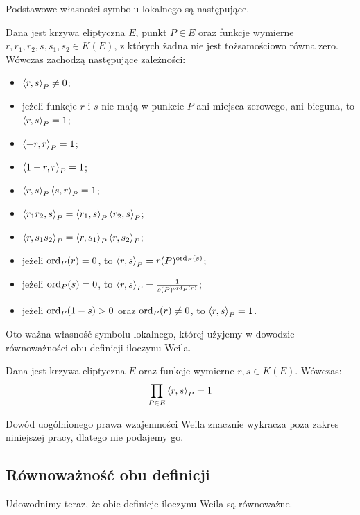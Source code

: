 Podstawowe własności symbolu lokalnego są następujące.

\begin{theorem}
Dana jest krzywa eliptyczna $E$, punkt $P \in E$
oraz funkcje wymierne $r, r_1, r_2, s, s_1, s_2 \in K(E)$,
z których żadna nie jest tożsamościowo równa zero.
Wówczas zachodzą następujące zależności:
\begin{itemize}
\item
$\left\langle r , s \right\rangle_{P} \neq 0$;
\item
jeżeli funkcje $r$ i $s$ nie mają w punkcie $P$
ani miejsca zerowego, ani bieguna,
to $\left\langle r , s \right\rangle_{P} = 1$;
\item
$\left\langle -r , r \right\rangle_{P} = 1$;
\item
$\left\langle 1-r , r \right\rangle_{P} = 1$;
\item
$\left\langle r , s \right\rangle_{P}\left\langle s , r \right\rangle_{P} = 1$;
\item
$\left\langle r_1r_2 , s \right\rangle_{P} = \left\langle r_1 , s \right\rangle_{P}\left\langle r_2 , s \right\rangle_{P}$;
\item
$\left\langle r , s_1s_2 \right\rangle_{P} = \left\langle r , s_1 \right\rangle_{P}\left\langle r , s_2 \right\rangle_{P}$;
\item
jeżeli $\operatorname{ord}_P(r) = 0$, to $\left\langle r , s \right\rangle_{P} = r(P)^{\operatorname{ord}_P(s)}$;
\item
jeżeli $\operatorname{ord}_P(s) = 0$, to $\left\langle r , s \right\rangle_{P} = \frac{1}{s(P)^{\operatorname{ord}_P(r)}}$;
\item
jeżeli $\operatorname{ord}_P(1-s) > 0$ oraz $\operatorname{ord}_P(r) \neq 0$, to $\left\langle r , s \right\rangle_{P} = 1$.
\end{itemize}
\end{theorem}

Oto ważna własność symbolu lokalnego,
której użyjemy w dowodzie równoważności obu definicji iloczynu Weila.

\begin{theorem}
Dana jest krzywa eliptyczna $E$ oraz funkcje wymierne $r, s \in K(E)$.
Wówczas:
\begin{equation}
\prod_{P \in E} \left\langle r , s \right\rangle_{P} = 1
\end{equation}
\end{theorem}

Dowód uogólnionego prawa wzajemności Weila znacznie wykracza
poza zakres niniejszej pracy, dlatego nie podajemy go.

\subsection*{Równoważność obu definicji}

Udowodnimy teraz, że obie definicje iloczynu Weila są równoważne.

